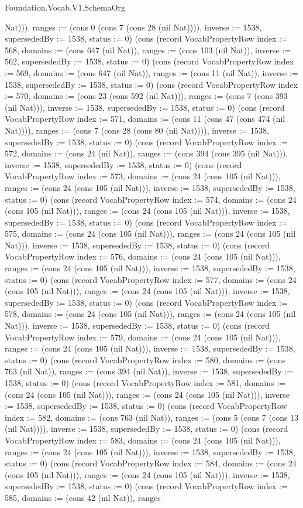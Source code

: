 \begin{lexlean}{Foundation.Vocab.V1.SchemaOrg}
\begin{semanticmodule}
{Nat))), ranges := (cons 0 (cons 7 (cons 28 (nil Nat)))), inverse := 1538, supersededBy := 1538, status := 0}) (cons (record VocabPropertyRow {index := 568, domains := (cons 647 (nil Nat)), ranges := (cons 103 (nil Nat)), inverse := 562, supersededBy := 1538, status := 0}) (cons (record VocabPropertyRow {index := 569, domains := (cons 647 (nil Nat)), ranges := (cons 11 (nil Nat)), inverse := 1538, supersededBy := 1538, status := 0}) (cons (record VocabPropertyRow {index := 570, domains := (cons 23 (cons 592 (nil Nat))), ranges := (cons 7 (cons 393 (nil Nat))), inverse := 1538, supersededBy := 1538, status := 0}) (cons (record VocabPropertyRow {index := 571, domains := (cons 11 (cons 47 (cons 474 (nil Nat)))), ranges := (cons 7 (cons 28 (cons 80 (nil Nat)))), inverse := 1538, supersededBy := 1538, status := 0}) (cons (record VocabPropertyRow {index := 572, domains := (cons 24 (nil Nat)), ranges := (cons 394 (cons 395 (nil Nat))), inverse := 1538, supersededBy := 1538, status := 0}) (cons (record VocabPropertyRow {index := 573, domains := (cons 24 (cons 105 (nil Nat))), ranges := (cons 24 (cons 105 (nil Nat))), inverse := 1538, supersededBy := 1538, status := 0}) (cons (record VocabPropertyRow {index := 574, domains := (cons 24 (cons 105 (nil Nat))), ranges := (cons 24 (cons 105 (nil Nat))), inverse := 1538, supersededBy := 1538, status := 0}) (cons (record VocabPropertyRow {index := 575, domains := (cons 24 (cons 105 (nil Nat))), ranges := (cons 24 (cons 105 (nil Nat))), inverse := 1538, supersededBy := 1538, status := 0}) (cons (record VocabPropertyRow {index := 576, domains := (cons 24 (cons 105 (nil Nat))), ranges := (cons 24 (cons 105 (nil Nat))), inverse := 1538, supersededBy := 1538, status := 0}) (cons (record VocabPropertyRow {index := 577, domains := (cons 24 (cons 105 (nil Nat))), ranges := (cons 24 (cons 105 (nil Nat))), inverse := 1538, supersededBy := 1538, status := 0}) (cons (record VocabPropertyRow {index := 578, domains := (cons 24 (cons 105 (nil Nat))), ranges := (cons 24 (cons 105 (nil Nat))), inverse := 1538, supersededBy := 1538, status := 0}) (cons (record VocabPropertyRow {index := 579, domains := (cons 24 (cons 105 (nil Nat))), ranges := (cons 24 (cons 105 (nil Nat))), inverse := 1538, supersededBy := 1538, status := 0}) (cons (record VocabPropertyRow {index := 580, domains := (cons 763 (nil Nat)), ranges := (cons 394 (nil Nat)), inverse := 1538, supersededBy := 1538, status := 0}) (cons (record VocabPropertyRow {index := 581, domains := (cons 24 (cons 105 (nil Nat))), ranges := (cons 24 (cons 105 (nil Nat))), inverse := 1538, supersededBy := 1538, status := 0}) (cons (record VocabPropertyRow {index := 582, domains := (cons 763 (nil Nat)), ranges := (cons 5 (cons 7 (cons 13 (nil Nat)))), inverse := 1538, supersededBy := 1538, status := 0}) (cons (record VocabPropertyRow {index := 583, domains := (cons 24 (cons 105 (nil Nat))), ranges := (cons 24 (cons 105 (nil Nat))), inverse := 1538, supersededBy := 1538, status := 0}) (cons (record VocabPropertyRow {index := 584, domains := (cons 24 (cons 105 (nil Nat))), ranges := (cons 24 (cons 105 (nil Nat))), inverse := 1538, supersededBy := 1538, status := 0}) (cons (record VocabPropertyRow {index := 585, domains := (cons 42 (nil Nat)), ranges }
\end{semanticmodule}
\end{lexlean}
